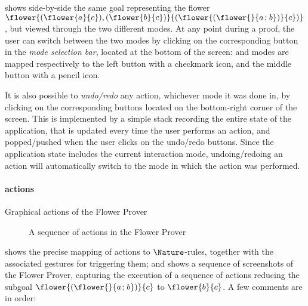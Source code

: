  shows side-by-side the same goal representing the
flower $\flower{(\flower{a}{c}),(\flower{b}{c})}{(\flower{(\flower{}{a \sep
b})}{c})}$, but viewed through the two different modes. At any point during a
proof, the user can switch between the two modes by clicking on the
corresponding button in the \emph{mode selection bar}, located at the bottom of
the screen: \Proof and \Edit modes are mapped respectively to the left button with
a checkmark icon, and the middle button with a pencil icon.

It is also possible to \emph{undo/redo} any action, whichever mode it was done
in, by clicking on the corresponding buttons located on the bottom-right corner
of the screen. This is implemented by a simple stack recording the entire state
of the application, that is updated every time the user performs an action, and
popped/pushed when the user clicks on the undo/redo buttons. Since the
application state includes the current interaction mode, undoing/redoing an
action will automatically switch to the mode in which the action was performed.

\paragraph{\Proof actions}

\begin{table*}[h]
  
  \caption{Graphical actions of the Flower Prover}
\end{table*}

\begin{figure*}[h]
  
  \caption{A sequence of \Proof actions in the Flower Prover}
\end{figure*}

 shows the precise mapping of \Proof actions to
$\Nature$-rules, together with the associated gestures for triggering them; and
 shows a sequence of screenshots of the Flower
Prover, capturing the execution of a sequence of \Proof actions reducing the
subgoal $\flower{(\flower{}{a \sep b})}{c}$ to $\flower{b}{c}$. A few comments
are in order:


